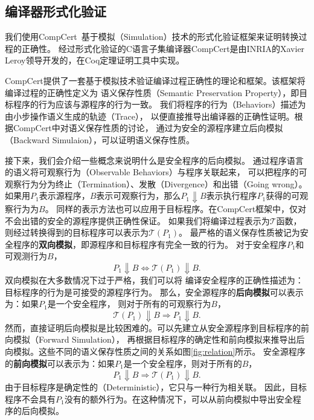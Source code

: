 \subsection{编译器形式化验证} \label{sec:compcertbackend}

我们使用CompCert~\cite{leroy2009formally}基于模拟（Simulation）技术的形式化验证框架来证明转换过程的正确性。
经过形式化验证的C语言子集编译器CompCert是由INRIA的Xavier Leroy领导开发的，在Coq定理证明工具中实现。

CompCert提供了一套基于模拟技术验证编译过程正确性的理论和框架。该框架将编译过程的正确性定义为
语义保存性质（Semantic Preservation Property），即目标程序的行为应该与源程序的行为一致。
我们将程序的行为（Behaviors）描述为由小步操作语义生成的轨迹（Trace），
以便直接推导出编译器的正确性证明。根据CompCert中对语义保存性质的讨论，
通过为安全的源程序建立后向模拟（Backward Simulaion），可以证明语义保存性质。

接下来，我们会介绍一些概念来说明什么是安全程序的后向模拟。
通过程序语言的语义将可观察行为（Observable Behaviors）与程序关联起来，
可以把程序的可观察行为分为终止（Termination）、发散（Divergence）和出错（Going wrong）。
如果用$P_1$表示源程序，$B$表示可观察行为，那么$P_1 \Downarrow B$表示执行程序$P_1$获得的可观察行为为$B$。
同样的表示方法也可以应用于目标程序。在CompCert框架中，仅对不会出错的安全的源程序提供正确性保证。
如果我们将编译过程表示为$\mathcal{T}$函数，则经过转换得到的目标程序可以表示为$\mathcal{T}(P_1)$。
最严格的语义保存性质被记为安全程序的\textbf{双向模拟}，即源程序和目标程序有完全一致的行为。
对于安全程序$P_1$和可观测行为$B$，
\begin{equation}
    P_1 \Downarrow B \Longleftrightarrow \mathcal{T}(P_1) \Downarrow B.
\end{equation}
双向模拟在大多数情况下过于严格，我们可以将
编译安全程序的正确性描述为：目标程序的行为是可接受的源程序行为。
那么，安全源程序的\textbf{后向模拟}可以表示为：如果$P_1$是一个安全程序，
则对于所有的可观察行为$B$，
\begin{equation}
    \mathcal{T}(P_1) \Downarrow B \Longrightarrow P_1 \Downarrow B.
\end{equation}
然而，直接证明后向模拟是比较困难的。可以先建立从安全源程序到目标程序的前向模拟（Forward Simulation），
再根据目标程序的确定性和前向模拟来推导出后向模拟。这些不同的语义保存性质之间的关系如图\ref{fig:relation}所示。
安全源程序的\textbf{前向模拟}可以表示为：如果$P_1$是一个安全程序，则对于所有的$B$，
\begin{equation}
P_1 \Downarrow B \Longrightarrow \mathcal{T}(P_1) \Downarrow B.
\end{equation}
由于目标程序是确定性的（Deterministic），它只与一种行为相关联。
因此，目标程序不会具有$P_1$没有的额外行为。在这种情况下，可以从前向模拟中导出安全程序的后向模拟。


